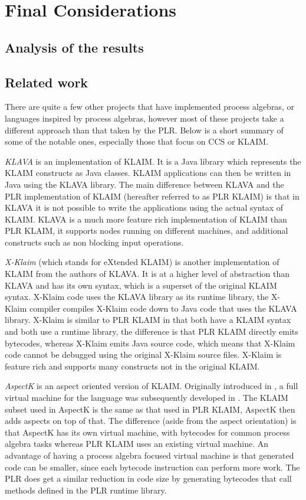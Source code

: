 \chapter{Final Considerations}

\section{Analysis of the results}

\section{Related work}\label{sec:related_work}
	
	There are quite a few other projects that have implemented process algebras, 
	or languages inspired by process algebras, however most of these projects 
	take a different approach than that taken by the PLR. Below is a short 
	summary of some of the notable ones, especially those that focus on CCS or 
	KLAIM.
	
	\textit{KLAVA} \cite{klava} is an implementation of KLAIM. It is a Java 
	library which represents the KLAIM constructs as Java classes. KLAIM 
	applications can then be written in Java using the KLAVA library. The main 
	difference between KLAVA and the PLR implementation of KLAIM (hereafter 
	referred to as PLR KLAIM) is that in KLAVA it is not possible to write the 
	applications using the actual syntax of KLAIM. KLAVA is a much more feature 
	rich implementation of KLAIM than PLR KLAIM, it supports nodes running on 
	different machines, and additional constructs such as non blocking input 
	operations.
	
	\textit{X-Klaim} \cite{xklaim} (which stands for eXtended KLAIM) is another 
	implementation of KLAIM from the authors of KLAVA. It is at a higher level 
	of abstraction than KLAVA and has its own syntax, which is a superset of
	the original KLAIM syntax. X-Klaim code uses the KLAVA library as its 
	runtime library, the X-Klaim compiler compiles X-Klaim code down to Java 
	code that uses the KLAVA library. X-Klaim is similar to PLR KLAIM in that 
	both have a KLAIM syntax and both use a runtime library, the difference is 
	that PLR KLAIM directly emits bytecodes, whereas X-Klaim emits Java source 
	code, which means that X-Klaim code cannot be debugged using the original
	X-Klaim source files. X-Klaim is feature rich and supports many constructs
	not in the original KLAIM.
	
	\textit{AspectK} is an aspect oriented version of KLAIM. Originally 
	introduced in \cite{aspectk}, a full virtual machine for the language was 
	subsequently developed in \cite{giordano}. The KLAIM subset used in AspectK 
	is the same as that used in PLR KLAIM, AspectK then adds aspects on top of 
	that. The difference (aside from the aspect orientation) is that AspectK has 
	its own virtual machine, with bytecodes for common process algebra tasks 
	whereas PLR KLAIM uses an existing virtual machine. An advantage of having a 
	process algebra focused virtual machine is that generated code can be 
	smaller, since each bytecode instruction can perform more work. The PLR does 
	get a similar reduction in code size by generating bytecodes that call 
	methods defined in the PLR runtime library.
	
